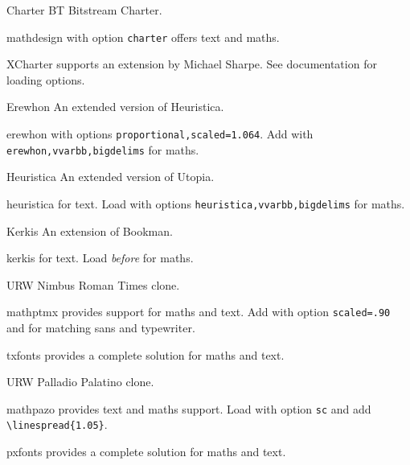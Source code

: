 \documentclass[a4paper,welsh,british,twocolumn]{article}
\begin{document}
\begin{fontopts}
  \item[Charter BT] Bitstream Charter.
  \begin{pkgdescription}
    \item[mathdesign] with option \verb|charter| offers text and maths.
	\item[XCharter] supports an extension by Michael Sharpe.
	See documentation for loading options.
  \end{pkgdescription}
  \item[Erewhon] An extended version of Heuristica.
  \begin{pkgdescription}
    \item[erewhon] with options \verb|proportional,scaled=1.064|.
	Add  with \verb|erewhon,vvarbb,bigdelims| for maths.
  \end{pkgdescription}
  \item[Heuristica] An extended version of Utopia.
  \begin{pkgdescription}
    \item[heuristica] for text.
	Load  with options \verb|heuristica,vvarbb,bigdelims| for maths.
  \end{pkgdescription}
  \item[Kerkis] An extension of Bookman.
  \begin{pkgdescription}
    \item[kerkis] for text.
	Load  \emph{before}  for maths.
  \end{pkgdescription}
  \item[URW Nimbus Roman] Times clone.
  \begin{pkgdescription}
    \item[mathptmx] provides support for maths and text.
	Add  with option \verb|scaled=.90| and  for matching sans and typewriter.
	\item[txfonts] provides a complete solution for maths and text.
  \end{pkgdescription}
  \item[URW Palladio] Palatino clone.
  \begin{pkgdescription}
    \item[mathpazo] provides text and maths support.
	Load with option \verb|sc| and add \verb|\linespread{1.05}|.
	\item[pxfonts] provides a complete solution for maths and text.
  \end{pkgdescription}

\end{fontopts}
\end{document}
